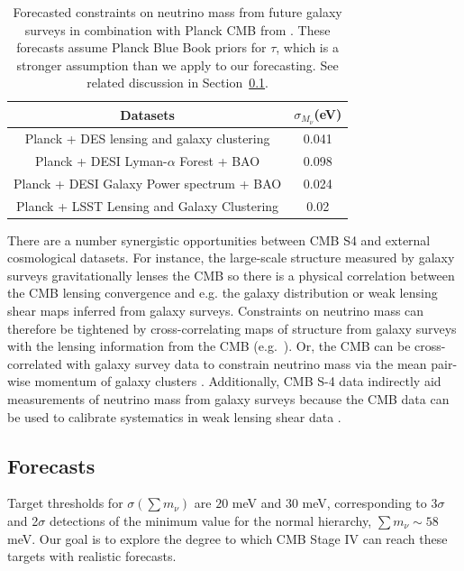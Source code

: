 \begin{table}[t!]
\begin{center}
\begin{tabular}{|c|c|} 
\hline
    				  Datasets 			& $\sigma_{M_\nu}$(eV) \\
				  \hline
Planck + DES lensing and galaxy clustering 		& 			0.041		\\
\hline
Planck + DESI Lyman-$\alpha$ Forest + BAO           &			0.098		\\
\hline
Planck + DESI Galaxy Power spectrum + BAO         &			0.024		\\
\hline
Planck + LSST Lensing and Galaxy Clustering         &   0.02					\\
\hline
\end{tabular}
\caption{Forecasted constraints on neutrino mass from future galaxy surveys in combination with Planck CMB from \cite{Font-Ribera:2013rwa}.  These forecasts assume Planck Blue Book priors for $\tau$, which is a stronger assumption than we apply to our forecasting.  See related discussion in Section~\ref{sec:nuforecasts}. }
\label{table:numassLSS}
\end{center}
\end{table}

There are a number synergistic opportunities between CMB S4 and external cosmological datasets. For instance, the large-scale structure measured by galaxy surveys gravitationally lenses the CMB so there is a physical correlation between the CMB lensing convergence and e.g. the galaxy distribution or weak lensing shear maps inferred from galaxy surveys. Constraints on neutrino mass can therefore be tightened by cross-correlating maps of structure from galaxy surveys with the lensing information from the CMB (e.g.\ \cite{Takeuchi:2013gpa, Pearson:2013iha}). Or, the CMB can be cross-correlated with galaxy survey data to constrain neutrino mass via the mean pair-wise momentum of galaxy clusters \cite{Mueller:2014dba}. Additionally, CMB S-4 data indirectly aid measurements of neutrino mass from galaxy surveys because the CMB data can be used to calibrate systematics in weak lensing shear data \cite{Das:2013aia}. 





\subsection{Forecasts}\label{sec:nuforecasts}

Target thresholds for $\sigma(\sum m_\nu)$ are $20$ meV and $30$ meV, corresponding to 3$\sigma$ and 2$\sigma$ detections of the minimum value for the normal hierarchy, $\sum m_\nu \sim 58$ meV.  Our goal is to explore the degree to which CMB Stage IV can reach these targets with realistic forecasts.  


